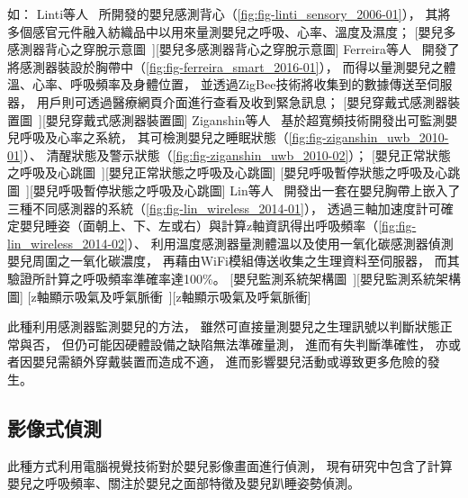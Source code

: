 \documentclass[class=NCU_thesis, crop=false]{standalone}
\begin{document}
如：
Linti等人~\cite{linti_sensory_2006}
所開發的嬰兒感測背心（\cref{fig:fig-linti_sensory_2006-01}），
其將多個感官元件融入紡織品中以用來量測嬰兒之呼吸、心率、溫度及濕度；
[嬰兒多感測器背心之穿脫示意圖~\cite{linti_sensory_2006}][嬰兒多感測器背心之穿脫示意圖]
Ferreira等人~\cite{ferreira_smart_2016}
開發了將感測器裝設於胸帶中（\cref{fig:fig-ferreira_smart_2016-01}），
而得以量測嬰兒之體溫、心率、呼吸頻率及身體位置，
並透過ZigBee技術將收集到的數據傳送至伺服器，
用戶則可透過醫療網頁介面進行查看及收到緊急訊息；
[嬰兒穿戴式感測器裝置圖~\cite{ferreira_smart_2016}][嬰兒穿戴式感測器裝置圖]
Ziganshin等人~\cite{ziganshin_uwb_2010}
基於超寬頻技術開發出可監測嬰兒呼吸及心率之系統，
其可檢測嬰兒之睡眠狀態（\cref{fig:fig-ziganshin_uwb_2010-01}）、
清醒狀態及警示狀態（\cref{fig:fig-ziganshin_uwb_2010-02}）；
[嬰兒正常狀態之呼吸及心跳圖~\cite{ziganshin_uwb_2010}][嬰兒正常狀態之呼吸及心跳圖]
[嬰兒呼吸暫停狀態之呼吸及心跳圖~\cite{ziganshin_uwb_2010}][嬰兒呼吸暫停狀態之呼吸及心跳圖]
Lin等人~\cite{lin_wireless_2014}
開發出一套在嬰兒胸帶上嵌入了三種不同感測器的系統（\cref{fig:fig-lin_wireless_2014-01}），
透過三軸加速度計可確定嬰兒睡姿（面朝上、下、左或右）與計算z軸資訊得出呼吸頻率（\cref{fig:fig-lin_wireless_2014-02}）、
利用溫度感測器量測體溫以及使用一氧化碳感測器偵測嬰兒周圍之一氧化碳濃度，
再藉由WiFi模組傳送收集之生理資料至伺服器，
而其驗證所計算之呼吸頻率準確率達100\%。
[嬰兒監測系統架構圖~\cite{lin_wireless_2014}][嬰兒監測系統架構圖]
[z軸顯示吸氣及呼氣脈衝~\cite{lin_wireless_2014}][z軸顯示吸氣及呼氣脈衝]

此種利用感測器監測嬰兒的方法，
雖然可直接量測嬰兒之生理訊號以判斷狀態正常與否，
但仍可能因硬體設備之缺陷無法準確量測，
進而有失判斷準確性，
亦或者因嬰兒需額外穿戴裝置而造成不適，
進而影響嬰兒活動或導致更多危險的發生。

\subsection{影像式偵測}
此種方式利用電腦視覺技術對於嬰兒影像畫面進行偵測，
現有研究中包含了計算嬰兒之呼吸頻率、關注於嬰兒之面部特徵及嬰兒趴睡姿勢偵測。
\end{document}
